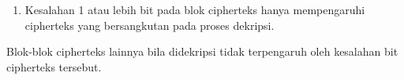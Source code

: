 \documentclass{article}
\begin{document}

\begin{enumerate}
  \item[2.] Kesalahan 1 atau lebih bit pada blok cipherteks hanya mempengaruhi cipherteks yang bersangkutan pada proses dekripsi.
\end{enumerate}

Blok-blok cipherteks lainnya bila didekripsi tidak terpengaruh oleh kesalahan bit cipherteks tersebut.
\end{document}
